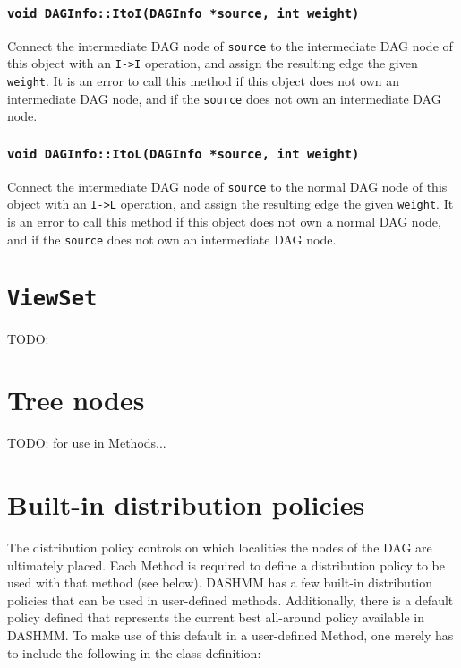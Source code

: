 \subsubsection{\texttt{void DAGInfo::ItoI(DAGInfo *source, int weight)}}

Connect the intermediate DAG node of \texttt{source} to the intermediate DAG
node of this object with an \texttt{I->I} operation, and assign the resulting
edge the given \texttt{weight}. It is an error to call this method if this
object does not own an intermediate DAG node, and if the \texttt{source} does
not own an intermediate DAG node.

\subsubsection{\texttt{void DAGInfo::ItoL(DAGInfo *source, int weight)}}

Connect the intermediate DAG node of \texttt{source} to the normal DAG
node of this object with an \texttt{I->L} operation, and assign the resulting
edge the given \texttt{weight}. It is an error to call this method if this
object does not own a normal DAG node, and if the \texttt{source} does
not own an intermediate DAG node.



\section{\texttt{ViewSet}}

TODO:



\section{Tree nodes}

TODO: for use in Methods...



\section{Built-in distribution policies}

The distribution policy controls on which localities the nodes of the DAG
are ultimately placed. Each Method is required to define a distribution policy
to be used with that method (see below). DASHMM has a few built-in distribution
policies that can be used in user-defined methods. Additionally, there is a
default policy defined that represents the current best all-around policy
available in DASHMM. To make use of this default in a user-defined Method,
one merely has to include the following in the class definition:

